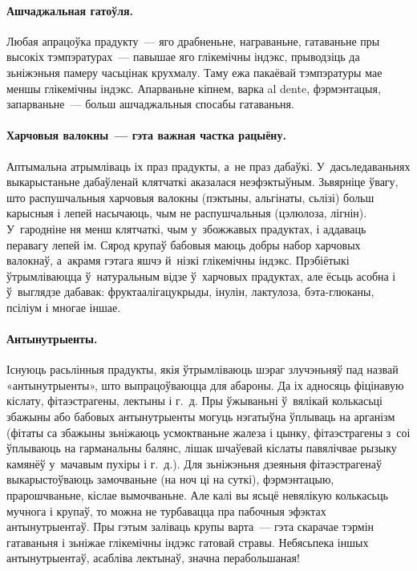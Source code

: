 \paragraph{Ашчаджальная гатоўля.}
Любая апрацоўка прадукту~--- яго драбненьне, награваньне, гатаваньне пры высокіх тэмпэратурах~--- павышае яго глікемічны індэкс, прыводзіць да зьніжэньня памеру часьцінак крухмалу. Таму ежа пакаёвай тэмпэратуры мае меншы глікемічны індэкс. Апарваньне кіпнем, варка al dente, фэрмэнтацыя, запарваньне~--- больш ашчаджальныя спосабы гатаваньня.

\paragraph{Харчовыя валокны~--- гэта важная частка рацыёну.}
Аптымальна атрымліваць іх праз прадукты, а~не праз дабаўкі. У~дасьледаваньнях выкарыстаньне дабаўленай клятчаткі аказалася неэфэктыўным. Зьвярніце ўвагу, што распушчальныя харчовыя валокны (пэктыны, альгінаты, сьлізі) больш карысныя і лепей насычаюць, чым не распушчальныя (цэлюлоза, лігнін). У~гародніне ня менш клятчаткі, чым у~збожжавых прадуктах, і аддаваць перавагу лепей ім. Сярод крупаў бабовыя маюць добры набор харчовых валокнаў, а~акрамя гэтага яшчэ й~нізкі глікемічны індэкс. Прэбіётыкі ўтрымліваюцца ў~натуральным відзе ў~харчовых прадуктах, але ёсьць асобна і ў~выглядзе дабавак: фруктаалігацукрыды, інулін, лактулоза, бэта-глюканы, псіліум і многае іншае.

\paragraph{Антынутрыенты.}
Існуюць расьлінныя прадукты, якія ўтрымліваюць шэраг злучэньняў пад назвай «антынутрыенты», што выпрацоўваюцца для абароны. Да іх адносяць фіцінавую кіслату, фітаэстрагены, лектыны і г.~д. Пры ўжываньні ў~вялікай колькасьці збажыны або бабовых антынутрыенты могуць нэгатыўна ўплываць на арганізм (фітаты са збажыны зьніжаюць усмоктваньне жалеза і цынку, фітаэстрагены з~соі ўплываюць на гарманальны балянс, лішак шчаўевай кіслаты павялічвае рызыку камянёў у~мачавым пухіры і г.~д.). Для зьніжэньня дзеяньня фітаэстрагенаў выкарыстоўваюць замочваньне (на ноч ці на суткі), фэрмэнтацыю, прарошчваньне, кіслае вымочваньне. Але калі вы ясьцё невялікую колькасьць мучнога і крупаў, то можна не турбавацца пра пабочныя эфэктах антынутрыентаў. Пры гэтым заліваць крупы варта~--- гэта скарачае тэрмін гатаваньня і зьніжае глікемічны індэкс гатовай стравы. Небясьпека іншых антынутрыентаў, асабліва лектынаў, значна перабольшаная!

